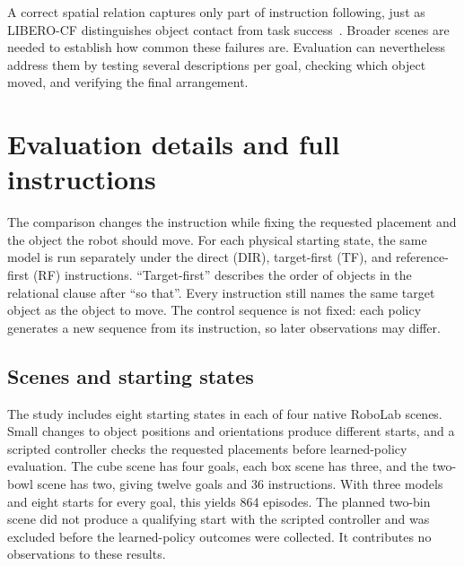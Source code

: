 \documentclass{article}
\begin{document}

A correct spatial relation captures only part of instruction following, just as LIBERO-CF distinguishes object contact from task success~\citep{fang2026counterfactual}. Broader scenes are needed to establish how common these failures are. Evaluation can nevertheless address them by testing several descriptions per goal, checking which object moved, and verifying the final arrangement.

\clearpage

\clearpage
\appendix

\setlength{\parskip}{5.5pt}
\section{Evaluation details and full instructions}
\label{app:tasks}
The comparison changes the instruction while fixing the requested placement and the object the robot should move. For each physical starting state, the same model is run separately under the direct (DIR), target-first (TF), and reference-first (RF) instructions. ``Target-first'' describes the order of objects in the relational clause after ``so that''. Every instruction still names the same target object as the object to move. The control sequence is not fixed: each policy generates a new sequence from its instruction, so later observations may differ.

\subsection{Scenes and starting states}
The study includes eight starting states in each of four native RoboLab scenes. Small changes to object positions and orientations produce different starts, and a scripted controller checks the requested placements before learned-policy evaluation. The cube scene has four goals, each box scene has three, and the two-bowl scene has two, giving twelve goals and 36 instructions. With three models and eight starts for every goal, this yields 864 episodes. The planned two-bin scene did not produce a qualifying start with the scripted controller and was excluded before the learned-policy outcomes were collected. It contributes no observations to these results.
\end{document}
